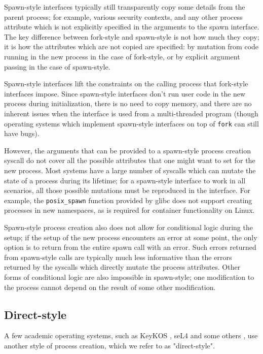 \documentclass{acmart}
\begin{document}
Spawn-style interfaces typically still transparently copy some details from the parent process;
for example, various security contexts,
and any other process attribute which is not explicitly specified in the arguments to the spawn interface.
The key difference between fork-style and spawn-style is not how much they copy;
it is how the attributes which are not copied are specified:
by mutation from code running in the new process in the case of fork-style,
or by explicit argument passing in the case of spawn-style.

Spawn-style interfaces lift the constraints on the calling process that fork-style interfaces impose.
Since spawn-style interfaces don't run user code in the new process during initialization,
there is no need to copy memory,
and there are no inherent issues when the interface is used from a multi-threaded program
(though operating systems which implement spawn-style interfaces on top of \texttt{fork} can still have bugs).

However, the arguments that can be provided to a spawn-style process creation syscall
do not cover all the possible attributes that one might want to set for the new process.
Most systems have a large number of syscalls which can mutate the state of a process during its lifetime;
for a spawn-style interface to work in all scenarios,
all those possible mutations must be reproduced in the interface.
For example, the \texttt{posix\_spawn} function provided by glibc does not support creating processes in new namespaces,
as is required for container functionality on Linux.

Spawn-style process creation also does not allow for conditional logic during the setup;
if the setup of the new process encounters an error at some point,
the only option is to return from the entire spawn call with an error.
Such errors returned from spawn-style calls
are typically much less informative
than the errors returned by the syscalls which directly mutate the process attributes.
Other forms of conditional logic are also impossible in spawn-style;
one modification to the process cannot depend on the result of some other modification.
\subsection{Direct-style}
A few academic operating systems, such as KeyKOS \cite{keykos}, seL4 \cite{sel4}
and some others \cite{exokernel} \cite{fuschia} \cite{singularity},
use another style of process creation, which we refer to as "direct-style".
\end{document}
